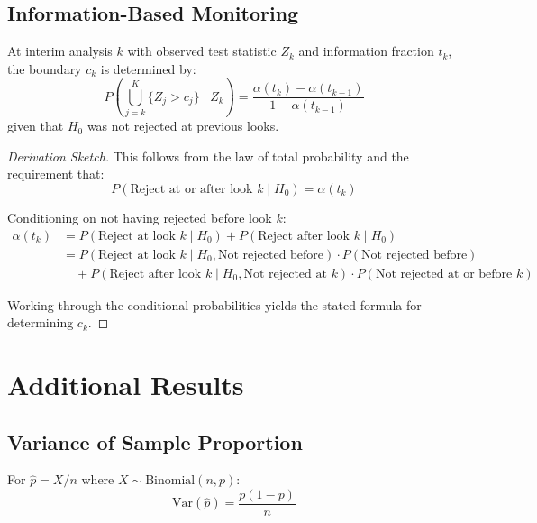 \subsection{Information-Based Monitoring}

\begin{theorem}
At interim analysis $k$ with observed test statistic $Z_k$ and information fraction $t_k$, the boundary $c_k$ is determined by:
\begin{equation}
P\left(\bigcup_{j=k}^K \{Z_j > c_j\} \mid Z_k \right) = \frac{\alpha(t_k) - \alpha(t_{k-1})}{1 - \alpha(t_{k-1})}
\end{equation}
given that $H_0$ was not rejected at previous looks.
\end{theorem}

\begin{proof}[Derivation Sketch]
This follows from the law of total probability and the requirement that:
\begin{equation}
P(\text{Reject at or after look } k \mid H_0) = \alpha(t_k)
\end{equation}

Conditioning on not having rejected before look $k$:
\begin{align}
\alpha(t_k) &= P(\text{Reject at look } k \mid H_0) + P(\text{Reject after look } k \mid H_0) \\
&= P(\text{Reject at look } k \mid H_0, \text{Not rejected before}) \cdot P(\text{Not rejected before}) \\
&\quad + P(\text{Reject after look } k \mid H_0, \text{Not rejected at } k) \cdot P(\text{Not rejected at or before } k)
\end{align}

Working through the conditional probabilities yields the stated formula for determining $c_k$.
\end{proof}

\section{Additional Results}

\subsection{Variance of Sample Proportion}

\begin{theorem}
For $\hat{p} = X/n$ where $X \sim \text{Binomial}(n, p)$:
\begin{equation}
\text{Var}(\hat{p}) = \frac{p(1-p)}{n}
\end{equation}
\end{theorem}

